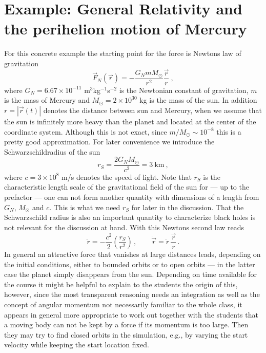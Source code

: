 \documentclass[12pt,ngerman,american]{iopart}
\begin{document}
\section{Example: General Relativity and the perihelion motion of Mercury}\label{sec:gr}
For this concrete example the starting point for the force is Newtons law of gravitation
\begin{equation}
\vec F_N(\vec r) = - \frac{G_N m M_\odot}{r^2} \frac{\vec r}{r}\ ,
\end{equation}
where $G_N=6.67\times 10^{-11}$ m$^3$kg$^{-1}$s$^{-2}$ is the Newtonian constant of gravitation, $m$ is the mass of Mercury and $M_\odot=2\times 10^{30}$ kg is the mass of the sun.
In addition $r=|\vec r(t)|$ denotes the distance between sun and Mercury, when we assume that the sun is infinitely more heavy than the planet and located at the center of the coordinate system. 
Although this is not exact, since $m/M_\odot\sim 10^{-8}$ this is a pretty good approximation.
For later convenience we introduce the Schwarzschildradius of the sun
\begin{equation}
r_S=\frac{2G_N  M_\odot}{c^2} = 3 \ \mbox{km} \ ,
\end{equation}
where $c=3\times 10^8$ m/s denotes the speed of light.
Note that $r_S$ is the characteristic length scale of the gravitational field of the sun for --- up to the prefactor --- one can not form another quantity with dimensions of a length from $G_N$, $M_\odot$ and $c$.
This is what we need $r_S$ for later in the discussion.
That the Schwarzschild radius is also an important quantity to characterize black holes is not relevant for the discussion at hand.
With this Newtons second law reads 
\begin{equation}
	\ddot{r}      = - \frac{c^2}{2}\left(\frac{r_S}{r^2}\right) \, , \qquad
	\ddot{\vec r} =   \ddot{r} \, \frac{\vec{r}}{r} \, .
\label{eq:newton}
\end{equation}
In general an attractive force that vanishes at large distances leads,  depending on the initial conditions, either to bounded orbits or to open orbits --- in the latter case the planet simply disappears from the sun.
Depending on time available for the course it might be helpful to explain to the students the origin of this, however, since the most transparent reasoning needs an integration as well as the concept of angular momentum not necessarily familiar to the whole class, it appears in general more appropriate to work out together with the students that a moving body can not be kept by a force if its momentum is too large.
Then they may try to find closed orbits in the simulation, e.g., by varying the start velocity while keeping the start location fixed.
\end{document}

